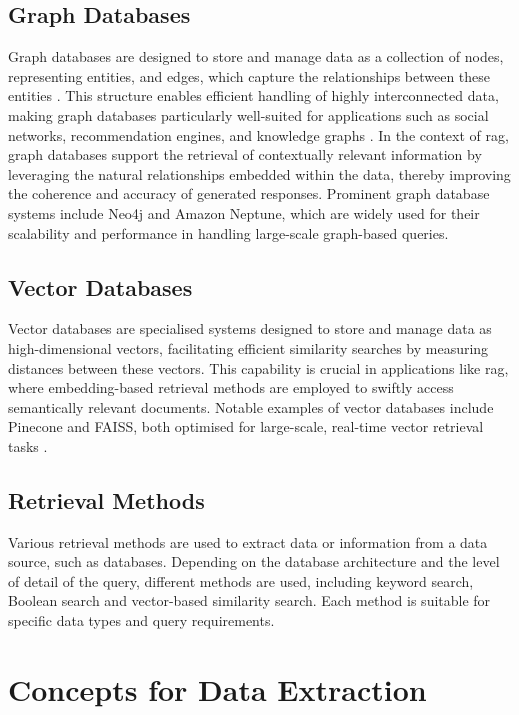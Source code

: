 \subsection{Graph Databases}\label{sec:graph-databases}
Graph databases are designed to store and manage data as a collection of nodes, representing entities, and edges, which capture the relationships between these entities \citep{Robinson2015}. 
This structure enables efficient handling of highly interconnected data, making graph databases particularly well-suited for applications such as social networks, recommendation engines, and knowledge graphs \citep{Angles2008}. 
In the context of \ac{rag}, graph databases support the retrieval of contextually relevant information by leveraging the natural relationships embedded within the data, thereby improving the coherence and accuracy of generated responses. 
Prominent graph database systems include Neo4j and Amazon Neptune, which are widely used for their scalability and performance in handling large-scale graph-based queries.

\subsection{Vector Databases}\label{sec:vector-databases}
Vector databases are specialised systems designed to store and manage data as high-dimensional vectors, facilitating efficient similarity searches by measuring distances between these vectors. 
This capability is crucial in applications like \ac{rag}, where embedding-based retrieval methods are employed to swiftly access semantically relevant documents. 
Notable examples of vector databases include Pinecone and FAISS, both optimised for large-scale, real-time vector retrieval tasks \citep{Johnson2019}.

\subsection{Retrieval Methods}\label{sec:retrieval-methods}

Various retrieval methods are used to extract data or information from a data source, such as databases. 
Depending on the database architecture and the level of detail of the query, different methods are used, including keyword search, Boolean search and vector-based similarity search. Each method is suitable for specific data types and query requirements.
\section{Concepts for Data Extraction}\label{sec:data-extraction-concepts}

